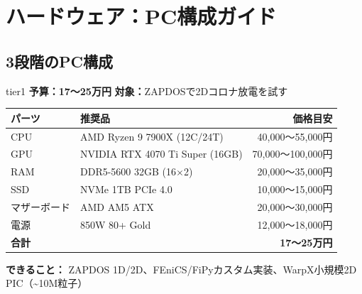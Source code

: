 \documentclass[12pt,a4paper]{ltjsarticle}
\begin{document}
\newpage
\section{ハードウェア：PC構成ガイド}

\subsection{3段階のPC構成}

\begin{tierbox}{tier1}
\textbf{予算：17〜25万円} \quad
\textbf{対象：}ZAPDOSで2Dコロナ放電を試す

\medskip\centering
\centering\sffamily\small
\begin{tabular}{@{}llr@{}}
\toprule
\textbf{パーツ} & \textbf{推奨品} & \textbf{価格目安} \\
\midrule
CPU & AMD Ryzen 9 7900X (12C/24T) & 40,000〜55,000円 \\
GPU & NVIDIA RTX 4070 Ti Super (16GB) & 70,000〜100,000円 \\
RAM & DDR5-5600 32GB (16$\times$2) & 20,000〜35,000円 \\
SSD & NVMe 1TB PCIe 4.0 & 10,000〜15,000円 \\
マザーボード & AMD AM5 ATX & 20,000〜30,000円 \\
電源 & 850W 80+ Gold & 12,000〜18,000円 \\
\midrule
\textbf{合計} & & \textbf{17〜25万円} \\
\bottomrule
\end{tabular}
\medskip

\textbf{できること：}
ZAPDOS 1D/2D、FEniCS/FiPyカスタム実装、WarpX小規模2D PIC（\textasciitilde 10M粒子）
\end{tierbox}

\vspace{0.5cm}
\end{document}
